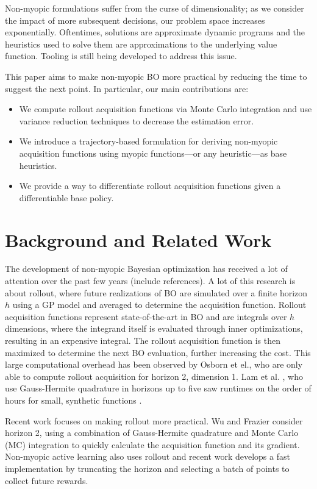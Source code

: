 \documentclass{article}
\begin{document}
Non-myopic formulations suffer from the curse of dimensionality; as we consider the impact of more 
subsequent decisions, our problem space increases exponentially. Oftentimes, solutions are 
approximate dynamic programs and the heuristics used to solve them are approximations to the underlying value function. Tooling is still being developed to address this issue.

This paper aims to make non-myopic BO more practical by reducing the time to suggest the next point. 
In particular, our main contributions are:
\begin{itemize}
    \item We compute rollout acquisition functions via Monte Carlo integration and use variance 
    reduction techniques to decrease the estimation error.
    \item We introduce a trajectory-based formulation for deriving non-myopic acquisition functions 
    using myopic functions—or any heuristic—as base heuristics.
    \item We provide a way to differentiate rollout acquisition functions given a differentiable base policy.
\end{itemize}

\section{Background and Related Work}
The development of non-myopic Bayesian optimization has received a lot of attention over the past 
few years (include references). A lot of this research is about rollout, where future realizations 
of BO are simulated over a finite horizon $h$ using a GP model and averaged to determine the 
acquisition function. Rollout acquisition functions represent state-of-the-art in BO and are 
integrals over $h$ dimensions, where the integrand itself is evaluated through inner optimizations, 
resulting in an expensive integral. The rollout acquisition function is then maximized to determine 
the next BO evaluation, further increasing the cost. This large computational overhead has been 
observed by Osborn et el.\cite{Osborne2009}, who are only able to compute rollout acquisition for 
horizon 2, dimension 1. Lam et al. \cite{Lam2016}, who use Gauss-Hermite quadrature in horizons 
up to five saw runtimes on the order of hours for small, synthetic functions \cite{Frazier2019}.

Recent work focuses on making rollout more practical. Wu and Frazier \cite{Frazier2019} consider horizon 2, using a 
combination of Gauss-Hermite quadrature \cite{liupierce1994} and Monte Carlo (MC) integration to quickly calculate the 
acquisition function and its gradient. Non-myopic active learning also uses rollout \cite{garnett2012bayesian, jiang2017efficient, jiang2018efficient, krause2007nonmyopic}
and recent work develops a fast implementation by truncating the horizon and selecting a 
batch of points to collect future rewards\cite{jiang2017efficient, jiang2018efficient}.
\end{document}
